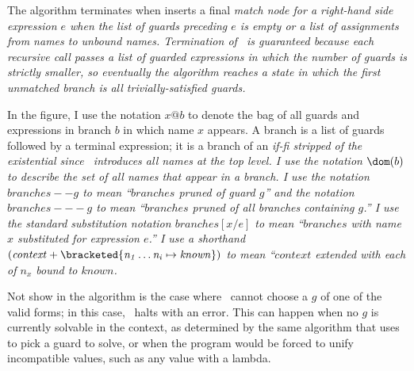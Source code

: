 \documentclass[manuscript,screen,review, 12pt, nonacm]{acmart}
\begin{document}
    The algorithm terminates when inserts a final \it{match} node for a
    right-hand side expression $e$ when the list of guards preceding $e$ is
    empty or a list of assignments from names to unbound names. Termination of
    \DTran\ is guaranteed because each recursive call passes a list of guarded
    expressions in which the number of guards is strictly smaller, so eventually
    the algorithm reaches a state in which the first unmatched branch is all
    trivially-satisfied guards. 

    In the figure, I use the notation $x@b$ to denote the bag of all guards and
    expressions in branch $b$ in which name $x$ appears. A branch is a list of
    guards followed by a terminal expression; it is a branch of an \it{if-fi}
    stripped of the existential since \DTran\ introduces all names at the top
    level. I use the notation $\dom(b)$ to describe the set of all names that
    appear in a branch. I use the notation $\mathit{branches -- g}$ to mean
    “$\mathit{branches}$ pruned of guard $g$” and the notation $\mathit{branches
    --- g}$ to mean “$\mathit{branches}$ pruned of all \it{branches} containing
    $g$.” I use the standard substitution notation $\mathit{branches[x/e]}$ to
    mean “$\mathit{branches}$ with name $x$ substituted for expression $e$.” I
    use a shorthand $\mathit{(context + \bracketed{n_1 \dots n_i \mapsto
    known})}$ to mean “$\mathit{context}$ extended with each of $n_x$ bound to
    $\mathit{known}$. 

    Not show in the algorithm is the case where \Compile\ cannot choose a $g$ of
    one of the valid forms; in this case, \Compile\ halts with an error. This
    can happen when no $g$ is currently solvable in the context, as determined
    by the same algorithm that \VMinus uses to pick a guard to solve, or when
    the program would be forced to unify incompatible values, such as any value
    with a lambda. 

       
\end{document}
